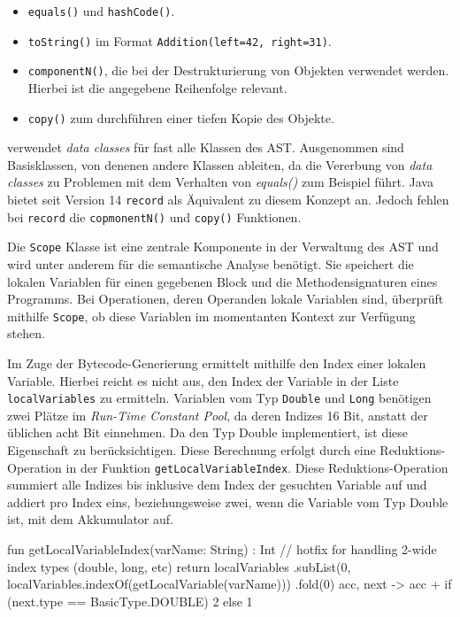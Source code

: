 \begin{itemize}
    \item \texttt{equals()} und \texttt{hashCode()}.
    \item \texttt{toString()} im Format \texttt{Addition(left=42, right=31)}.
    \item \texttt{componentN()}, die bei der Destrukturierung von Objekten verwendet werden. Hierbei ist die angegebene Reihenfolge relevant.
    \item \texttt{copy()} zum durchführen einer tiefen Kopie des Objekte.
\end{itemize}

\Toya verwendet \textit{data classes} für fast alle Klassen des AST. Ausgenommen sind Basisklassen, von denenen andere Klassen ableiten, da die Vererbung von \textit{data classes} zu Problemen mit dem Verhalten von \textit{equals()} zum Beispiel führt. Java bietet seit Version 14 \texttt{record} als Äquivalent zu diesem Konzept an. Jedoch fehlen bei \texttt{record} die \texttt{copmonentN()} und \texttt{copy()} Funktionen.

Die \texttt{Scope} Klasse ist eine zentrale Komponente in der Verwaltung des AST und wird unter anderem für die semantische Analyse benötigt. Sie speichert die lokalen Variablen für einen gegebenen Block und die Methodensignaturen eines \toya Programms. Bei Operationen, deren Operanden lokale Variablen sind, überprüft \toya mithilfe \texttt{Scope}, ob diese Variablen im momentanten Kontext zur Verfügung stehen.

Im Zuge der Bytecode-Generierung ermittelt \toya mithilfe \scope den Index einer lokalen Variable. Hierbei reicht es nicht aus, den Index der Variable in der Liste \texttt{localVariables} zu ermitteln. Variablen vom Typ \texttt{Double} und \texttt{Long} benötigen zwei Plätze im \textit{Run-Time Constant Pool}, da deren Indizes 16 Bit, anstatt der üblichen acht Bit einnehmen. Da \toya den Typ Double implementiert, ist diese Eigenschaft zu berücksichtigen. Diese Berechnung erfolgt durch eine Reduktions-Operation in der Funktion \texttt{getLocalVariableIndex}. Diese Reduktions-Operation summiert alle Indizes bis inklusive dem Index der gesuchten Variable auf und addiert pro Index eins, beziehungsweise zwei, wenn die Variable vom Typ Double ist, mit dem Akkumulator auf.

\begin{KotlinCode}[numbers=none, caption={Ermittlung des Index einer Variable in einem \texttt{Scope}}]
fun getLocalVariableIndex(varName: String) : Int {
    // hotfix for handling 2-wide index types (double, long, etc)
    return localVariables
        .subList(0, localVariables.indexOf(getLocalVariable(varName)))
        .fold(0) { acc, next ->
            acc + if (next.type == BasicType.DOUBLE) 2 else 1
        }
}
\end{KotlinCode}

